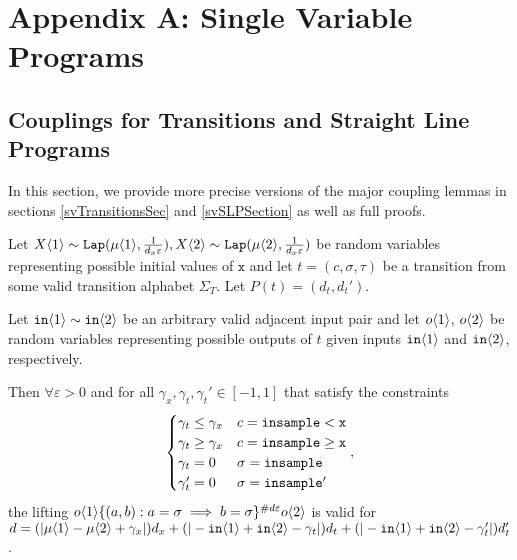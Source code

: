 

\section{Appendix A: Single Variable Programs}

\subsection{Couplings for Transitions and Straight Line Programs}

In this section, we provide more precise versions of the major coupling lemmas in sections \ref{svTransitionsSec} and \ref{svSLPSection} as well as full proofs. 


\begin{lemma}\label{indTransitionCoupling}
    Let $X\brangle{1}\sim \Lap(\mu\brangle{1}, \frac{1}{d_x\varepsilon}), X\brangle{2}\sim\Lap(\mu\brangle{2}, \frac{1}{d_x\varepsilon})$ be random variables representing possible initial values of $\texttt{x}$ and let $t = (c, \sigma, \tau)$ be a transition from some valid transition alphabet $\Sigma_T$.
    Let $P(t) = (d_t, d_t')$.

    Let $\texttt{in}\brangle{1}\sim \texttt{in}\brangle{2}$ be an arbitrary valid adjacent input pair and let $o\brangle{1}$, $o\brangle{2}$ be random variables representing possible outputs of $t$ given inputs $\texttt{in}\brangle{1}$ and $\texttt{in}\brangle{2}$, respectively. 

    Then $\forall \varepsilon>0$ and for all $\gamma_x, \gamma_t, \gamma_t'\in [-1, 1]$ that satisfy the constraints \[
        \begin{cases}
          \gamma_t\leq\gamma_x & c = \lguard[\texttt{x}]\\
          \gamma_t\geq\gamma_x & c = \gguard[\texttt{x}]\\
          \gamma_t=0 & \sigma = \texttt{insample}\\
          \gamma_t'=0 & \sigma = \texttt{insample}'
        \end{cases},
      \]
      the lifting $o\brangle{1}\{(a, b): a=\sigma\implies b=\sigma\}^{\#d\varepsilon}o\brangle{2}$ is valid for $d = (|\mu\brangle{1}-\mu\brangle{2}+\gamma_x|)d_x+(|-\texttt{in}\brangle{1}+\texttt{in}\brangle{2}-\gamma_t|)d_t+(|-\texttt{in}\brangle{1}+\texttt{in}\brangle{2}-\gamma_t'|)d_t'$.
\end{lemma}

